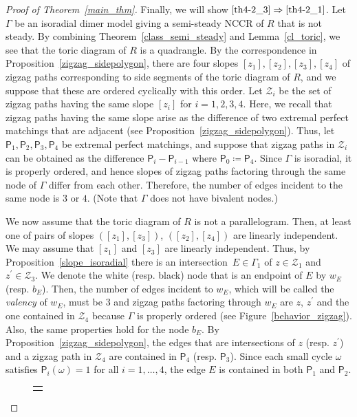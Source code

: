 \documentclass[ALCO,ThmDefs,Unicode]{cedram}
\newcommand{\calZ}{\mathcal{Z}}
\newcommand{\sfP}{\mathsf{P}}
\begin{document}
\begin{proof}[Proof of Theorem~\ref{main_thm}]
Finally, we will show $\eqref{th4-2_3}\Rightarrow\eqref{th4-2_1}$.
Let $\Gamma$ be an isoradial dimer model giving a semi-steady NCCR of $R$ that is not steady. By combining Theorem~\ref{class_semi_steady} and Lemma~\ref{cl_toric}, we see that the toric diagram of $R$ is a quadrangle. By the correspondence in Proposition~\ref{zigzag_sidepolygon}, there are four slopes $[z_1], [z_2],[z_3], [z_4]$ of zigzag paths corresponding to side segments of the toric diagram of $R$, and we suppose that these are ordered cyclically with this order. Let $\calZ_i$ be the set of zigzag paths having the same slope $[z_i]$ for $i=1,2,3,4$. Here, we recall that zigzag paths having the same slope arise as the difference of two extremal perfect matchings that are adjacent (see Proposition~\ref{zigzag_sidepolygon}). Thus, let $\sfP_1,\sfP_2, \sfP_3, \sfP_4$ be extremal perfect matchings, and suppose that zigzag paths in $\calZ_i$ can be obtained as the difference $\sfP_i-\sfP_{i-1}$ where $\sfP_0\coloneqq\sfP_4$. Since $\Gamma$ is isoradial, it is properly ordered, and hence slopes of zigzag paths factoring through the same node of $\Gamma$ differ from each other. Therefore, the number of edges incident to the same node is $3$ or $4$. (Note that $\Gamma$ does not have bivalent nodes.)

We now assume that the toric diagram of $R$ is not a parallelogram. Then, at least one of pairs of slopes $([z_1], [z_3])$, $([z_2], [z_4])$ are linearly independent. We may assume that $[z_1]$ and $[z_3]$ are linearly independent. Thus, by Proposition~\ref{slope_isoradial} there is an intersection~$E\in\Gamma_1$ of $z\in\calZ_1$ and $z^\prime\in\calZ_3$. We denote the white (resp. black) node that is an endpoint of $E$ by $w_E$ (resp. $b_E$). Then, the number of edges incident to $w_E$, which will be called the \emph{valency} of $w_E$, must be $3$ and zigzag paths factoring through $w_E$ are $z$, $z^\prime$ and the one contained in $\calZ_4$ because $\Gamma$ is properly ordered (see Figure~\ref{behavior_zigzag}). Also, the same properties hold for the node $b_E$. By Proposition~\ref{zigzag_sidepolygon}, the edges that are intersections of $z$ (resp. $z^\prime$) and a zigzag path in $\calZ_4$ are contained in $\sfP_4$ (resp. $\sfP_3$). Since each small cycle $\omega$ satisfies $\sfP_i(\omega)=1$ for all $i=1,\dots,4$, the edge $E$ is contained in both $\sfP_1$ and $\sfP_2$.

\begin{figure}[H]
\begin{tabular}{@{}c@{}}
\begin{minipage}{0.5 \hsize}
\begin{center}
{\scalebox{0.7}{
\begin{tikzpicture}
\newcommand{\edgewidth}{0.05cm}
\newcommand{\nodewidth}{0.05cm}
\newcommand{\noderad}{0.16}


\end{tikzpicture}}}
\end{center}
\end{minipage}
\end{tabular}
\end{figure}
\end{proof}
\end{document}

